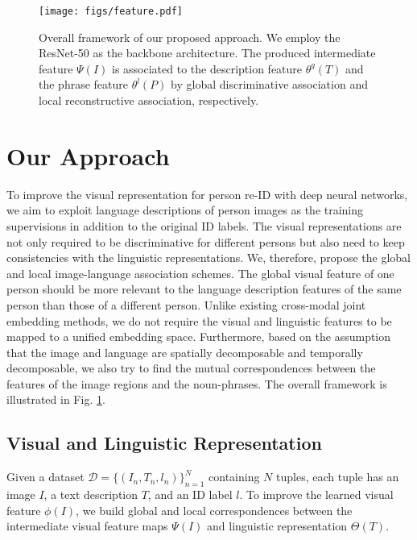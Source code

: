 \documentclass[runningheads]{llncs}
\begin{document}
\begin{figure}[t]
\vspace{-1em}
\centering
\texttt{[image: figs/feature.pdf]}
\vspace{-1em}
\caption{Overall framework of our proposed approach. We employ the ResNet-50 as the backbone architecture. The produced intermediate feature $\Psi(I)$ is associated to the description feature $\theta^{g}(T)$ and the phrase feature $\theta^{l}(P)$ by global discriminative association and local reconstructive association, respectively.}  \label{Overall_framework}
\vspace{-1em}
\end{figure}


\section{Our Approach}



To improve the visual representation for person re-ID with deep neural networks, we aim to exploit language descriptions of person images as the training supervisions in addition to the original ID labels. The visual representations are not only required to be discriminative for different persons but also need to keep consistencies with the linguistic representations. We, therefore,  propose the global and local image-language association schemes. The global visual feature of one person should be more relevant to the language description features of the same person than those of a different person. Unlike existing cross-modal joint embedding methods, we do not require the visual and linguistic features to be mapped to a unified embedding space. Furthermore, based on the assumption that the image and language are spatially decomposable and temporally decomposable, we also try to find the mutual correspondences between the features of the image regions and the noun-phrases. The overall framework is illustrated in Fig. 
\ref{Overall_framework}.




\subsection{Visual and Linguistic Representation}

Given a dataset $\mathcal{D}=\{(I_{n}, T_{n}, l_{n})\}_{n=1}^{N}$ containing $N$ tuples, each tuple has an image $I$, a text description $T$, and an ID label $l$. To improve the learned visual feature $\phi(I)$, we build global and local correspondences between the intermediate visual feature maps $\Psi(I)$ and linguistic representation $\Theta(T)$. 
\end{document}
